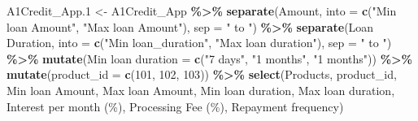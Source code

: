\documentclass[
]{article}
\newenvironment{Shaded}{\begin{snugshade}}{\end{snugshade}}
\newcommand{\AttributeTok}[1]{\textcolor[rgb]{0.13,0.29,0.53}{#1}}
\newcommand{\DecValTok}[1]{\textcolor[rgb]{0.00,0.00,0.81}{#1}}
\newcommand{\FloatTok}[1]{\textcolor[rgb]{0.00,0.00,0.81}{#1}}
\newcommand{\FunctionTok}[1]{\textcolor[rgb]{0.13,0.29,0.53}{\textbf{#1}}}
\newcommand{\NormalTok}[1]{#1}
\newcommand{\OtherTok}[1]{\textcolor[rgb]{0.56,0.35,0.01}{#1}}
\newcommand{\SpecialCharTok}[1]{\textcolor[rgb]{0.81,0.36,0.00}{\textbf{#1}}}
\newcommand{\StringTok}[1]{\textcolor[rgb]{0.31,0.60,0.02}{#1}}
\begin{document}
\begin{Shaded}
\begin{Highlighting}[]
\NormalTok{A1Credit\_App}\FloatTok{.1} \OtherTok{\textless{}{-}}\NormalTok{ A1Credit\_App }\SpecialCharTok{\%\textgreater{}\%} 
  \FunctionTok{separate}\NormalTok{(Amount, }\AttributeTok{into =} \FunctionTok{c}\NormalTok{(}\StringTok{"Min loan Amount"}\NormalTok{, }\StringTok{"Max loan Amount"}\NormalTok{), }\AttributeTok{sep =} \StringTok{" to "}\NormalTok{) }\SpecialCharTok{\%\textgreater{}\%} 
  \FunctionTok{separate}\NormalTok{(}\StringTok{\textasciigrave{}}\AttributeTok{Loan Duration}\StringTok{\textasciigrave{}}\NormalTok{, }\AttributeTok{into =} \FunctionTok{c}\NormalTok{(}\StringTok{"Min loan\_duration"}\NormalTok{, }\StringTok{"Max loan duration"}\NormalTok{), }\AttributeTok{sep =} \StringTok{" to "}\NormalTok{) }\SpecialCharTok{\%\textgreater{}\%} 
  \FunctionTok{mutate}\NormalTok{(}\StringTok{\textasciigrave{}}\AttributeTok{Min loan duration}\StringTok{\textasciigrave{}} \OtherTok{=} \FunctionTok{c}\NormalTok{(}\StringTok{"7 days"}\NormalTok{, }\StringTok{"1 months"}\NormalTok{, }\StringTok{"1 months"}\NormalTok{)) }\SpecialCharTok{\%\textgreater{}\%}
  \FunctionTok{mutate}\NormalTok{(}\AttributeTok{product\_id =} \FunctionTok{c}\NormalTok{(}\DecValTok{101}\NormalTok{, }\DecValTok{102}\NormalTok{, }\DecValTok{103}\NormalTok{)) }\SpecialCharTok{\%\textgreater{}\%} 
  \FunctionTok{select}\NormalTok{(Products, product\_id, }\StringTok{\textasciigrave{}}\AttributeTok{Min loan Amount}\StringTok{\textasciigrave{}}\NormalTok{, }\StringTok{\textasciigrave{}}\AttributeTok{Max loan Amount}\StringTok{\textasciigrave{}}\NormalTok{, }\StringTok{\textasciigrave{}}\AttributeTok{Min loan duration}\StringTok{\textasciigrave{}}\NormalTok{, }\StringTok{\textasciigrave{}}\AttributeTok{Max loan duration}\StringTok{\textasciigrave{}}\NormalTok{, }\StringTok{\textasciigrave{}}\AttributeTok{Interest per month (\%)}\StringTok{\textasciigrave{}}\NormalTok{, }\StringTok{\textasciigrave{}}\AttributeTok{Processing Fee (\%)}\StringTok{\textasciigrave{}}\NormalTok{, }\StringTok{\textasciigrave{}}\AttributeTok{Repayment frequency}\StringTok{\textasciigrave{}}\NormalTok{)}
\end{Highlighting}
\end{Shaded}
\end{document}
